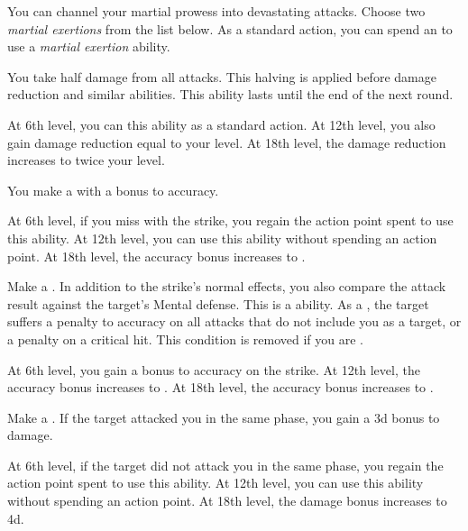         You can channel your martial prowess into devastating attacks.
        Choose two \textit{martial exertions} from the list below.
        As a standard action, you can spend an  to use a \textit{martial exertion} ability.
        {
             You take half damage from all attacks.
            This halving is applied before damage reduction and similar abilities.
            This ability lasts until the end of the next round.
            \par At 6th level, you can  this ability as a standard action.
            At 12th level, you also gain damage reduction equal to your level.
            At 18th level, the damage reduction increases to twice your level.

             You make a  with a  bonus to accuracy.
            \par At 6th level, if you miss with the strike, you regain the action point spent to use this ability.
            At 12th level, you can use this ability without spending an action point.
            At 18th level, the accuracy bonus increases to .

             Make a .
            In addition to the strike's normal effects, you also compare the attack result against the target's Mental defense.
            This is a  ability.
            As a , the target suffers a  penalty to accuracy on all attacks that do not include you as a target, or a  penalty on a critical hit.
            This condition is removed if you are .
            \par At 6th level, you gain a  bonus to accuracy on the strike.
            At 12th level, the accuracy bonus increases to .
            At 18th level, the accuracy bonus increases to .

             Make a .
            If the target attacked you in the same phase, you gain a \plus3d bonus to damage.
            \par At 6th level, if the target did not attack you in the same phase, you regain the action point spent to use this ability.
            At 12th level, you can use this ability without spending an action point.
            At 18th level, the damage bonus increases to \plus4d.

}
